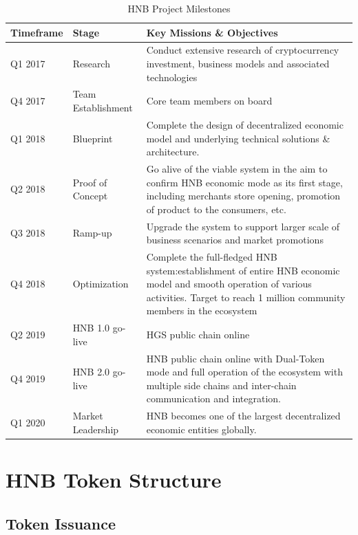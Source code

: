 \documentclass[fleqn,10pt]{SelfArx} %
\begin{document}
\begin{table}[!hbt]
\caption{HNB Project Milestones}
\centering
\begin{tabular}{p{2cm}p{3cm}p{11cm}}
\toprule
Timeframe
 & Stage & Key Missions \& Objectives  \\
\midrule
Q1 2017 & 
Research
 & 
Conduct extensive research of cryptocurrency investment, business models and associated technologies\\
\midrule
Q4 2017 & 
Team Establishment 
 & 
Core team members on board\\
\midrule
Q1 2018 & 
Blueprint
 & 
Complete the design of decentralized economic model and underlying technical solutions \& architecture.\\
\midrule
Q2 2018 & 
Proof of Concept
 & 
Go alive of the viable system in the aim to confirm HNB economic mode as its first stage, including merchants store opening, promotion of product to the consumers, etc.
\\
\midrule
Q3 2018 & 
Ramp-up
 & 
Upgrade the system to support larger scale of business scenarios and market promotions\\
\midrule
Q4 2018 & 
Optimization
 & 
Complete the full-fledged HNB system:establishment of entire HNB economic model and smooth operation of various activities. Target to reach 1 million community members in the ecosystem\\
\midrule
Q2 2019 & 
HNB 1.0 go-live
 & 
HGS public chain online\\
\midrule
Q4 2019 & 
HNB 2.0 go-live
 & 
HNB public chain online with Dual-Token mode and full operation of the ecosystem with multiple side chains and inter-chain communication and integration. \\
\midrule
Q1 2020 & 
Market Leadership
 & 
HNB becomes one of the largest decentralized economic entities globally. \\
\bottomrule
\end{tabular}
\label{tab:label}
\end{table}

\cleardoublepage

\newpage
\cleardoublepage


\section{HNB Token Structure}

\subsection{Token Issuance}
\end{document}
